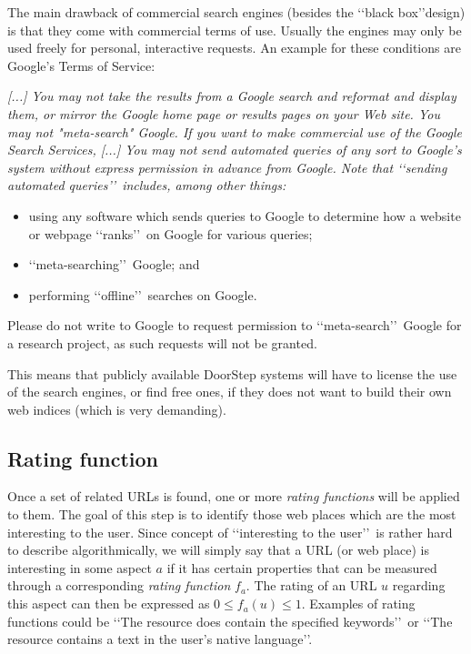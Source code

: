 \documentclass[a4paper]{danarticle}
\theoremstyle{remark}
\begin{document}
       The main drawback of commercial search engines (besides the \lq\lq black 
       box\rq\rq design) is that they come with commercial terms of use. 
       Usually the
       engines may only be used freely for personal, interactive requests. An 
       example for these conditions are Google's Terms of Service\cite{googletou}:
       \begin{center}
       \begin{minipage}{10cm}
       \itshape
       [...] You may not take the
       results from a Google search and reformat and display them, or mirror
       the Google home page or results pages on your Web site. You may not
       "meta-search" Google. If you want to make commercial use of the Google
       Search Services, 
       [...]
       You may not send automated queries of any sort to Google's system
       without express permission in advance from Google. Note that 
       \lq\lq sending
       automated queries\rq\rq\ includes, among other things:
       \begin{itemize}
       \item{using any software which sends queries to Google to determine how
             a website or webpage \lq\lq ranks\rq\rq\ on Google for various 
             queries;}
       \item{\lq\lq meta-searching\rq\rq\ Google; and}
       \item{performing \lq\lq offline\rq\rq\ searches on Google.}
       \end{itemize}
       Please do not write to Google to request permission to 
       \lq\lq meta-search\rq\rq\
       Google for a research project, as such requests will not be granted.
       \end{minipage}
       \end{center}
       This means that publicly available DoorStep systems will have to license 
       the use of the search engines, or find free ones, if they does not want to 
       build their own web indices (which is very demanding).
     \subsection{Rating function}
       Once a set of related URLs is found, one or more 
       \textit{rating functions} will be applied to them. The goal
       of this step is to identify those web places which are the
       most interesting to the user. Since concept of \lq\lq interesting to the
       user\rq\rq\ is rather hard to describe algorithmically, we will simply 
       say that a URL (or web place) is
       interesting in some aspect $ a $ if it has certain properties that can be
       measured through a corresponding \textit{rating function} 
       $ f_a $. The rating of an URL $ u $ regarding this aspect
       can then be expressed as $ 0 \leq f_a(u) \leq 1 $.
       Examples of rating
       functions could be \lq\lq The resource does contain the specified
       keywords\rq\rq\ or \lq\lq The resource contains a text in the user's
       native language\rq\rq .
       
\end{document}
